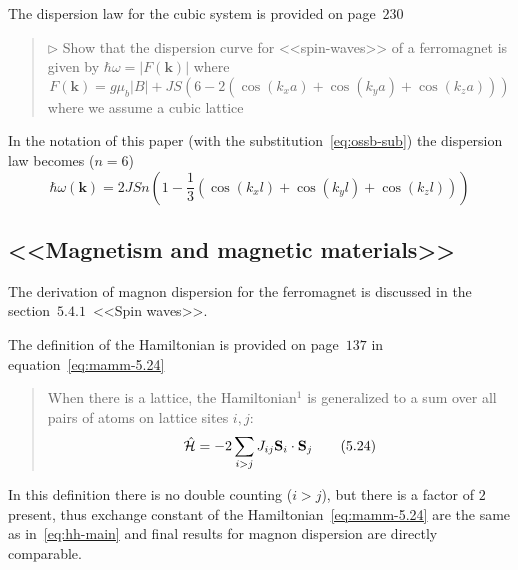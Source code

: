     The dispersion law for the cubic system is provided  on page~$230$
    \begin{quote}
        $\triangleright$ Show that the dispersion curve for <<spin-waves>> of a ferromagnet is given by $\hbar\omega = \vert F(\mathbf{k})\vert$  where
        \begin{equation}
            F(\mathbf{k}) = g\mu_b\vert B \vert + JS\left(6 - 2\left(\cos(k_xa) + \cos(k_ya) + \cos(k_za)\right)\right)
        \end{equation}
        where we assume a cubic lattice
    \end{quote}

    In the notation of this paper (with the substitution~\eqref{eq:ossb-sub}) the dispersion law becomes ($n = 6$)
    \begin{equation}
        \hbar\omega(\mathbf{k}) = 2JSn\left(1 - \dfrac{1}{3}\left(\cos(k_xl) + \cos(k_yl) + \cos(k_zl)\right)\right)
    \end{equation}
\subsection{<<Magnetism and magnetic materials>>\cite{coey2010magnetism}}
    The derivation of magnon dispersion for the ferromagnet is discussed in the section~$5.4.1$~<<Spin waves>>.

    The definition of the Hamiltonian is provided on page~$137$ in equation~\eqref{eq:mamm-5.24}

    \begin{quote}
        When there is a lattice, the Hamiltonian$^1$ is generalized to a sum over all pairs of atoms on lattice sites $i, j$:
        \begin{equation}
            \hat{\mathcal{H}} = -2\sum_{i > j} J_{ij} \mathbf{S}_i \cdot \mathbf{S}_j \label{eq:mamm-5.24} \tag{5.24}
        \end{equation}
    \end{quote}

    In this definition there is no double counting ($i > j$), but there is a factor of $2$ present, thus exchange constant of the Hamiltonian~\eqref{eq:mamm-5.24} are the same as in~\eqref{eq:hh-main}
    and final results for magnon dispersion are directly comparable.

